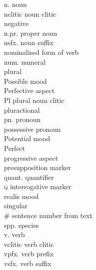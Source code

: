 \begin{multicols}{2}
\begin{tabbing}
	n. \> noun\\
	nclitic \> noun clitic\\
	\NEG \> negative \\
	n.pr. \> proper noun\\
	nsfx. \> noun suffix\\
	\NOM \> nominalised form of verb\\
	num. \> numeral\\
	\plural \> plural\\
	\PBL \> Possible mood\\
	\PFV \> Perfective aspect\\
	Pl \> plural noun clitic\\
	\PLU \> pluractional\\
	pn. \> pronoun\\
	\POSS \> possessive pronoun\\
	\POT \> Potential mood\\
	\PRF \> Perfect\\
	\PRG \> progressive aspect\\
	\PSP \> presupposition marker\\
	quant. \> quantifier \\
	\textsc{q} \>interrogative marker\\
   	\realis \> realis mood\\
	\singular \> singular\\
	\sennum \# \> sentence number from text\\
	spp. \> species\\
	v. \> verb\\
  	vclitic \> verb clitic\\
	vpfx. \> verb prefix\\
	vsfx. \> verb suffix\\
\end{tabbing}
 
\end{multicols} 
\setlength{\parindent}{10pt}
